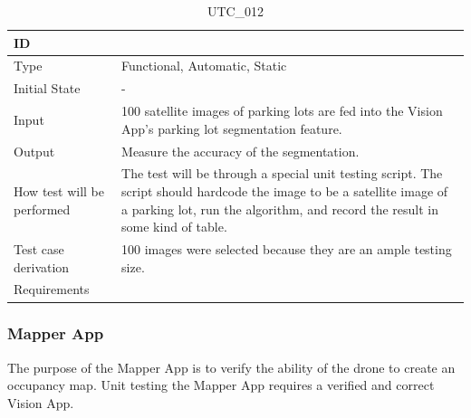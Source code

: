 \documentclass[12pt, titlepage]{article}
\begin{document}
\begin{table}[!h]
\begin{center}
\caption {UTC\_012}
\label{tab:UTC_012}
\begin{tabular}{ | m{3.2cm} | m{12.2cm} | } 
\hline
ID & \nameref{tab:UTC_012} \\ 
\hline
Type &  Functional, Automatic, Static  \\ 
\hline
Initial State & -\\ 
\hline
Input &  100 satellite images of parking lots are fed into the Vision App's parking lot segmentation feature.\\ 
\hline
Output &  Measure the accuracy of the segmentation. \\ 
\hline
How test will be performed & The test will be through a special unit testing script. The script should hardcode the image to be a satellite image of a parking lot, run the algorithm, and record the result in some kind of table. \\ 
\hline
Test case derivation & 100 images were selected because they are an ample testing size.  \\ 
\hline
Requirements & \nameref{GEN_001} \\ 
\hline
\end{tabular}
\end{center}
\end{table}


\subsubsection{Mapper App}

The purpose of the Mapper App is to verify the ability of the drone to create an occupancy map. Unit testing the Mapper App requires a verified and correct Vision App.
\end{document}
